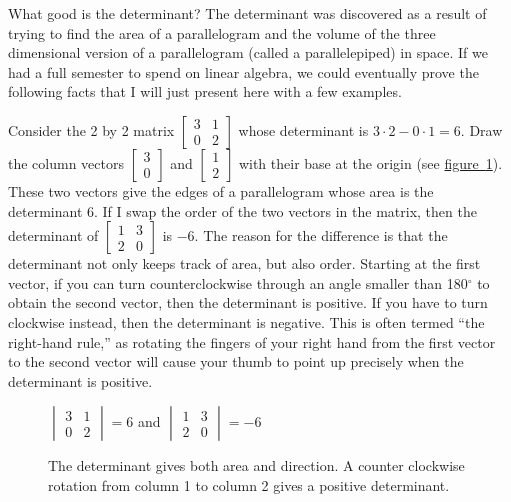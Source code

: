 \documentclass[10pt,]{book}
\theoremstyle{plain}
\theoremstyle{definition}
\theoremstyle{definition}
\theoremstyle{definition}
\theoremstyle{definition}
\theoremstyle{definition}
\numberwithin{equation}{section}
\newcommand{\amp}{&}
\begin{document}
What good is the determinant? The determinant was discovered as a result of trying to find the area of a parallelogram and the volume of the three dimensional version of a parallelogram (called a parallelepiped) in space. If we had a full semester to spend on linear algebra, we could eventually prove the following facts that I will just present here with a few examples.%
\par
Consider the 2 by 2 matrix \(\begin{bmatrix}3\amp 1\\0\amp 2
\end{bmatrix}\) whose determinant is \(3\cdot 2-0\cdot 1=6\). Draw the column vectors \(\begin{bmatrix}3\\0
\end{bmatrix}\) and \(\begin{bmatrix}1\\2
\end{bmatrix}\) with their base at the origin (see \hyperref[detfig]{figure~\ref{detfig}}). These two vectors give the edges of a parallelogram whose area is the determinant \(6\). If I swap the order of the two vectors in the matrix, then the determinant of \(\begin{bmatrix}1\amp 3\\2\amp 0
\end{bmatrix}\) is \(-6\). The reason for the difference is that the determinant not only keeps track of area, but also order. Starting at the first vector, if you can turn counterclockwise through an angle smaller than 180\(^\circ\) to obtain the second vector, then the determinant is positive. If you have to turn clockwise instead, then the determinant is negative. This is often termed ``the right-hand rule,'' as rotating the fingers of your right hand from the first vector to the second vector will cause your thumb to point up precisely when the determinant is positive.%
\begin{figure}
\centering
{
\vspace{2pt}
$\begin{vmatrix}{3}\amp {1}\\{0}\amp {2}\end{vmatrix}=6$ and $\begin{vmatrix}{1}\amp {3}\\{2}\amp 0\end{vmatrix}=-6$
}
\caption{The determinant gives both area and direction. A counter clockwise rotation from column 1 to column 2 gives a positive determinant.\label{detfig}}
\end{figure}
\end{document}
